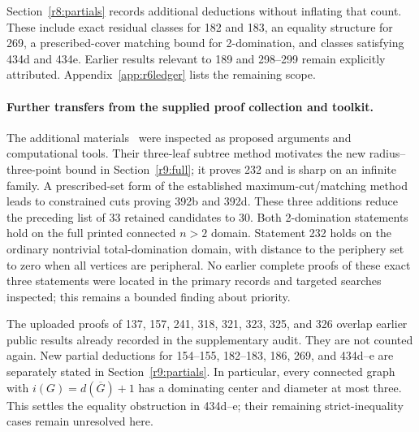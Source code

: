 \documentclass[11pt,a4paper]{article}
\theoremstyle{remark}
\begin{document}
Section~\ref{r8:partials} records additional deductions without inflating
that count. These include exact residual classes for 182 and 183,
an equality structure for 269, a prescribed-cover matching bound for
2-domination, and classes satisfying 434d and 434e. Earlier results
relevant to 189 and 298--299 remain explicitly attributed.
Appendix~\ref{app:r6ledger} lists the remaining scope.

\paragraph{Further transfers from the supplied proof collection and toolkit.}
The additional materials~\cite{UserProofsR9,UserToolkitR9} were inspected
as proposed arguments and computational tools. Their three-leaf subtree
method motivates the new radius--three-point bound in
Section~\ref{r9:full}; it proves 232 and is sharp on an infinite family.
A prescribed-set form of the established maximum-cut/matching method
leads to constrained cuts proving 392b and 392d. These three additions
reduce the preceding list of 33 retained candidates to 30.
Both 2-domination statements hold on the full printed connected $n>2$
domain. Statement 232 holds on the ordinary nontrivial total-domination
domain, with distance to the periphery set to zero when all vertices
are peripheral. No earlier complete proofs of these exact three
statements were located in the primary records and targeted searches
inspected; this remains a bounded finding about priority.

The uploaded proofs of 137, 157, 241, 318, 321, 323, 325, and 326
overlap earlier public results already recorded in the supplementary
audit. They are not counted again. New partial deductions for 154--155,
182--183, 186, 269, and 434d--e are separately stated in
Section~\ref{r9:partials}. In particular, every connected graph with
$i(G)=d(\overline G)+1$ has a dominating center and diameter at most
three. This settles the equality obstruction in 434d--e; their
remaining strict-inequality cases remain unresolved here.
\end{document}
